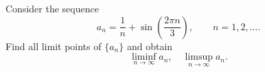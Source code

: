 \begin{exercise}
  \label{ex:hw03:oscillating-sequence}
  Consider the sequence
  \[
    a_n=\frac{1}{n}+\sin\left(\frac{2\pi n}{3}\right),
    \qquad n=1,2,\ldots.
  \]
  Find all limit points of $\{a_n\}$ and obtain
  \[
    \liminf_{n\to\infty}a_n,\quad\limsup_{n\to\infty}a_n.
  \]
\end{exercise}
